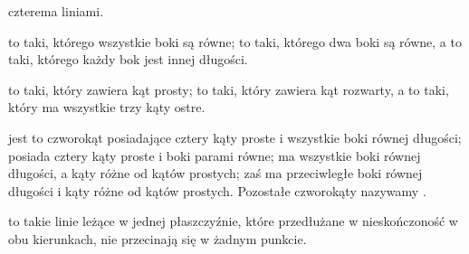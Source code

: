     czterema liniami.
\item {} to taki, którego wszystkie boki są równe;
     to taki, którego dwa boki są równe,
    a  to taki, którego każdy bok jest innej długości.
\item {} to taki, który zawiera kąt prosty;
     to taki, który zawiera kąt rozwarty,
    a  to taki, który ma wszystkie trzy kąty ostre.
\item {} jest to czworokąt posiadające cztery kąty proste
    i wszystkie boki równej długości;  posiada cztery
    kąty proste i boki parami równe;  ma wszystkie boki równej
    długości, a kąty różne od kątów prostych;  zaś
    ma przeciwległe boki równej długości i kąty różne od kątów prostych.
    Pozostałe czworokąty nazywamy .
\item {} to takie linie leżące w jednej płaszczyźnie,
    które przedłużane w nieskończoność w obu kierunkach, nie przecinają
    się w żadnym punkcie.
